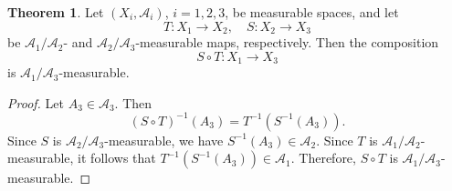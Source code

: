 \documentclass[12pt]{article}
\theoremstyle{definition}
\newtheorem{theorem}{Theorem}[section]
\begin{document}
\medskip
\begin{theorem}
Let \( (X_i, \mathcal{A}_i) \), \( i = 1, 2, 3 \), be measurable spaces, and let
\[
T : X_1 \to X_2, \quad S : X_2 \to X_3
\]
be \( \mathcal{A}_1 / \mathcal{A}_2 \)- and \( \mathcal{A}_2 / \mathcal{A}_3 \)-measurable maps, respectively. Then the composition
\[
S \circ T : X_1 \to X_3
\]
is \( \mathcal{A}_1 / \mathcal{A}_3 \)-measurable.
\end{theorem}

\begin{proof}
Let \( A_3 \in \mathcal{A}_3 \). Then
\[
(S \circ T)^{-1}(A_3) = T^{-1}\left(S^{-1}(A_3)\right).
\]
Since \( S \) is \( \mathcal{A}_2 / \mathcal{A}_3 \)-measurable, we have \( S^{-1}(A_3) \in \mathcal{A}_2 \). Since \( T \) is \( \mathcal{A}_1 / \mathcal{A}_2 \)-measurable, it follows that \( T^{-1}(S^{-1}(A_3)) \in \mathcal{A}_1 \). Therefore, \( S \circ T \) is \( \mathcal{A}_1 / \mathcal{A}_3 \)-measurable.
\end{proof}
\end{document}
